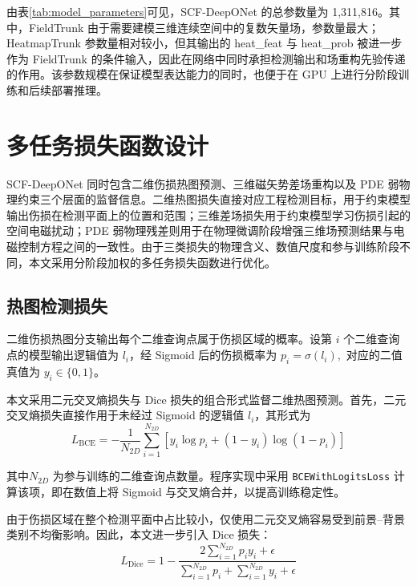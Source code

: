 由表\ref{tab:model_parameters}可见，SCF-DeepONet 的总参数量为 1,311,816。其中，FieldTrunk 由于需要建模三维连续空间中的复数矢量场，参数量最大；HeatmapTrunk 参数量相对较小，但其输出的 heat\_feat 与 heat\_prob 被进一步作为 FieldTrunk 的条件输入，因此在网络中同时承担检测输出和场重构先验传递的作用。该参数规模在保证模型表达能力的同时，也便于在 GPU 上进行分阶段训练和后续部署推理。

\section{多任务损失函数设计}
\label{sec:multi_task_loss}

SCF-DeepONet 同时包含二维伤损热图预测、三维磁矢势差场重构以及 PDE 弱物理约束三个层面的监督信息。二维热图损失直接对应工程检测目标，用于约束模型输出伤损在检测平面上的位置和范围；三维差场损失用于约束模型学习伤损引起的空间电磁扰动；PDE 弱物理残差则用于在物理微调阶段增强三维场预测结果与电磁控制方程之间的一致性。由于三类损失的物理含义、数值尺度和参与训练阶段不同，本文采用分阶段加权的多任务损失函数进行优化。

\subsection{热图检测损失}
\label{subsec:heatmap_loss}

二维伤损热图分支输出每个二维查询点属于伤损区域的概率。设第 $i$ 个二维查询点的模型输出逻辑值为 $l_i$，经 Sigmoid 后的伤损概率为
$
p_i=\sigma(l_i),
$
对应的二值真值为 $y_i\in\{0,1\}$。

本文采用二元交叉熵损失与 Dice 损失的组合形式监督二维热图预测。首先，二元交叉熵损失直接作用于未经过 Sigmoid 的逻辑值 $l_i$，其形式为
\begin{equation}
\label{eq:bce_loss}
L_{\mathrm{BCE}}
=
-\frac{1}{N_{2D}}
\sum_{i=1}^{N_{2D}}
\left[
y_i\log p_i
+
(1-y_i)\log(1-p_i)
\right]
\end{equation}

其中$N_{2D}$ 为参与训练的二维查询点数量。程序实现中采用 \verb|BCEWithLogitsLoss| 计算该项，即在数值上将 Sigmoid 与交叉熵合并，以提高训练稳定性。

由于伤损区域在整个检测平面中占比较小，仅使用二元交叉熵容易受到前景--背景类别不均衡影响。因此，本文进一步引入 Dice 损失：
\begin{equation}
\label{eq:dice_loss}
L_{\mathrm{Dice}}
=
1-
\frac{
2\sum_{i=1}^{N_{2D}}p_i y_i+\epsilon
}{
\sum_{i=1}^{N_{2D}}p_i+
\sum_{i=1}^{N_{2D}}y_i+\epsilon
}
\end{equation}


